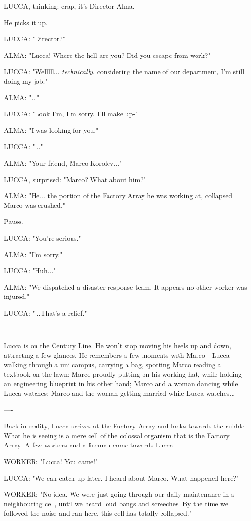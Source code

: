 \documentclass[11pt]{article}
\begin{document}
LUCCA, thinking: crap, it's Director Alma.

He picks it up.

LUCCA: "Director?"

ALMA: "Lucca! Where the hell are you? Did you escape from work?"

LUCCA: "Welllll... \textit{technically}, considering the name of our department, I'm still doing my job."

ALMA: "..."

LUCCA: "Look I'm, I'm sorry. I'll make up-"

ALMA: "I was looking for you."

LUCCA: "..."

ALMA: "Your friend, Marco Korolev..."

LUCCA, surprised: "Marco? What about him?"

ALMA: "He... the portion of the Factory Array he was working at, collapsed. Marco was crushed."

Pause.

LUCCA: "You're serious."

ALMA: "I'm sorry."

LUCCA: "Huh..."

ALMA: "We dispatched a disaster response team. It appears no other worker was injured."

LUCCA: "...That's a relief."

----

Lucca is on the Century Line. He won't stop moving his heels up and down, attracting a few glances. He remembers a few moments with Marco - Lucca walking through a uni campus, carrying a bag, spotting Marco reading a textbook on the lawn; Marco proudly putting on his working hat, while holding an engineering blueprint in his other hand; Marco and a woman dancing while Lucca watches; Marco and the woman getting married while Lucca watches...

----

Back in reality, Lucca arrives at the Factory Array and looks towards the rubble. What he is seeing is a mere cell of the colossal organism that is the Factory Array. A few workers and a fireman come towards Lucca.

WORKER: "Lucca! You came!"

LUCCA: "We can catch up later. I heard about Marco. What happened here?"

WORKER: "No idea. We were just going through our daily maintenance in a neighbouring cell, until we heard loud bangs and screeches. By the time we followed the noise and ran here, this cell has totally collapsed."
\end{document}
